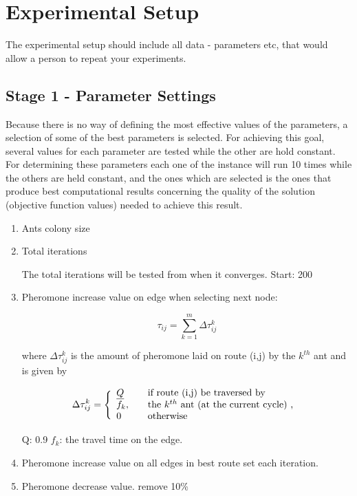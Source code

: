 \section{Experimental Setup}

The experimental setup should include all data - parameters etc, that would allow a person to repeat your experiments. 
 
\subsection{Stage 1 - Parameter Settings}

Because there is no way of defining the most effective values of the parameters, a selection of some of the best parameters is selected. For achieving this goal, several values for each parameter are tested while the other are hold constant. For determining these parameters each one of the instance will run 10 times while the others are held constant, and the ones which are selected is the ones that produce best computational results concerning the quality of the solution (objective function values) needed to achieve this result. 

\begin{enumerate}
\item Ants colony size
\item Total iterations

The total iterations will be tested from when it converges. Start: 200

\item Pheromone increase value on edge when selecting next node:

$$ \tau_{ij} = \sum_{k=1}^{m} \Delta \tau^k_{ij}$$

where $ \Delta \tau^k_{ij} $ is the amount of pheromone laid on route (i,j) by the $k^{th}$ ant and is given by

$$
\Delta \tau^k_{ij} = \Bigg\{
\begin{array}{l l}
\underline{Q} &  \quad \text{if route (i,j) be traversed by}\\
f_k, &  \quad \text{the $k^{th}$ ant (at the current cycle) , }\\
0 &  \quad \text{otherwise}
\end{array}
$$

Q: 0.9
\newline
$f_k$: the travel time on the edge.

\item Pheromone increase value on all edges in best route set each iteration.
\item Pheromone decrease value. remove 10\%

\end{enumerate}

